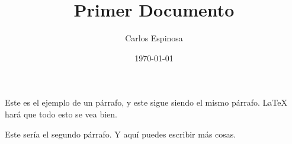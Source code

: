 \documentclass{article}
\author{Carlos Espinosa}
\title{Primer Documento}
\date{\today}
\begin{document}
\maketitle
Este     es el ejemplo de un p\'arrafo,
y este
sigue
siendo el mismo p\'arrafo. \LaTeX{} har\'a que todo esto se vea bien.

Este ser\'ia el segundo p\'arrafo.
Y aqu\'i puedes escribir m\'as cosas.
\end{document}
